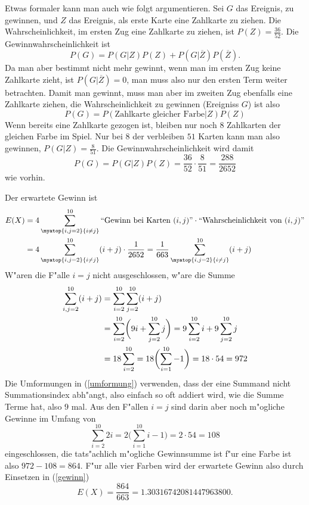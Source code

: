 \begin{loesung}
\begin{teilaufgaben}
Etwas formaler kann man auch wie folgt argumentieren.
Sei $G$ das Ereignis, zu gewinnen, und $Z$ das Ereignis, als erste
Karte eine Zahlkarte zu ziehen.
Die Wahrscheinlichkeit,
im ersten Zug eine Zahlkarte zu ziehen, ist $P(Z)=\frac{36}{52}$.
Die Gewinnwahrscheinlichkeit ist
\[
P(G)=
P(G|Z)P(Z)
+P(G|\overline{Z})P(\overline{Z}).
\]
Da man aber bestimmt nicht mehr gewinnt, wenn man im ersten Zug
keine Zahlkarte zieht, ist $P(G|\overline{Z})=0$, man muss
also nur den ersten Term weiter betrachten.
Damit man
gewinnt, muss man aber im zweiten Zug ebenfalls eine Zahlkarte ziehen,
die Wahrscheinlichkeit zu gewinnen (Ereigniss $G$) ist also
\[
P(G)=P(\text{Zahlkarte gleicher Farbe}|Z)P(Z)
\]
Wenn bereits eine Zahlkarte gezogen ist, bleiben nur noch $8$
Zahlkarten der gleichen Farbe im Spiel. Nur bei $8$ der
verbleiben $51$ Karten kann man also gewinnen, $P(G|Z)=\frac{8}{51}$.
Die Gewinnwahrscheinlichkeit wird damit
\[
P(G)=
P(G|Z)P(Z)
=\frac{36}{52}\cdot\frac{8}{51}= \frac{288}{2652}
\]
wie vorhin.
\item
Der erwartete Gewinn ist
\begin{align}
E(X)&=4\sum_{\myatop{i,j=2}{i \ne j}}^{10} \text{``Gewinn bei Karten $(i,j)$''}
\cdot\text{``Wahrscheinlichkeit von $(i,j)$''}
\notag
\\
&=
4\sum_{\myatop{i,j=2}{i\ne j}}^{10}(i+j)\cdot\frac1{2652}
=
\frac{1}{663}\sum_{\myatop{i,j=2}{i\ne j}}^{10}(i+j)
\label{gewinn}
\end{align}
W"aren die F"alle $i=j$ nicht ausgeschlossen, w"are die Summe
\begin{align}
\sum_{i,j=2}^{10}(i+j)
&=
\sum_{i=2}^{10}\sum_{j=2}^{10}(i+j)
\notag
\\
&=
\sum_{i=2}^{10}\biggl(9i + \sum_{j=2}^{10}j\biggr)
=
9\sum_{i=2}^{10}i +9\sum_{j=2}^{10}j
\label{umformung}
\\
&=
18 \sum_{i=2}^{10}
\notag
=
18 \biggl(\sum_{i=1}^{10}-1\biggr)
=18\cdot 54= 972
\notag
\end{align}
Die Umformungen in (\ref{umformung}) verwenden, dass der eine
Summand nicht Summationsindex abh"angt, also einfach so oft
addiert wird, wie die Summe Terme hat, also $9$ mal.
Aus den F"allen $i=j$ sind darin aber noch
m"ogliche Gewinne im Umfang von
\[
\sum_{i=2}^{10}2i=2\biggl(\sum_{i=1}^{10}i-1\biggr)=2\cdot 54=108
\]
eingeschlossen, die tats"achlich m"ogliche Gewinnsumme ist
f"ur eine Farbe ist also $972-108=864$. F"ur alle vier Farben
wird der erwartete Gewinn also durch Einsetzen in (\ref{gewinn})
\[
E(X)=\frac{864}{663}=
1.30316742081447963800
.
\]


\end{teilaufgaben}
\end{loesung}
